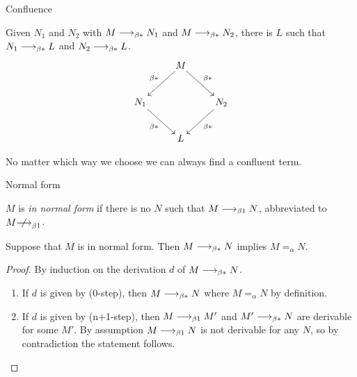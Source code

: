 \begin{frame}{Confluence}
\begin{theorem}
  Given $N_1$ and $N_2$ with $M \longrightarrow_{\beta*} N_1$ and $M\longrightarrow_{\beta*} N_2$, there is $L$
  such that $N_1 \longrightarrow_{\beta*} L$ and $N_2 \longrightarrow_{\beta*} L$. 
  \[
    \xymatrix{
      & M \ar[rd]^{\beta*} \ar[ld]_{\beta*} \\
      N_1 \ar[rd]_{\beta*} & & N_2 \ar[ld]^{\beta*} \\
      & L
    }
  \]
\end{theorem}

No matter which way we choose we can always find a \alert{confluent}
term. 

\end{frame}

\begin{frame}{Normal form}
  \begin{definition}
    $M$ is \emph{in normal form} if 
    there is no $N$ such that $M \longrightarrow_{\beta1} N$, abbreviated to $M \notonereduce$.
    
  \end{definition}
  \begin{lemma}
    Suppose that $M$ is in normal form. Then 
      $M \longrightarrow_{\beta*} N$ implies $M =_\alpha N$.
  \label{lem:normal-no-reduction}%
  \end{lemma}
  \begin{proof}
    By induction on the derivation $d$ of $M \longrightarrow_{\beta*} N$.
    \begin{enumerate}
      \item If $d$ is given by (0-step), then
        $M \longrightarrow_{\beta*} N$ where $M =_\alpha N$ by definition.

      \item If $d$ is given by (n+1-step), then
        $M \longrightarrow_{\beta1} M'$ and $M' \longrightarrow_{\beta*} N$ are derivable for some $M'$. By
        assumption $M \longrightarrow_{\beta1} N$ is not derivable for any $N$, so by
        contradiction the statement follows.
    \end{enumerate}
  \end{proof}

\end{frame}

